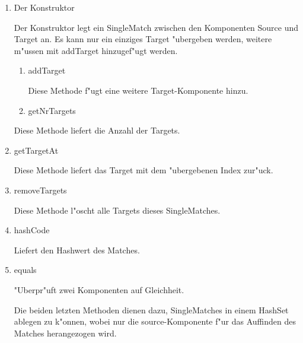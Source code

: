 \documentclass[a4paper,10pt,twoside]{scrreprt}
\begin{document}
\begin{enumerate}
\item Der Konstruktor

Der Konstruktor legt ein SingleMatch zwischen den Komponenten Source und Target an. Es kann nur ein einziges Target "ubergeben werden, weitere m"ussen mit addTarget hinzugef"ugt werden.
\begin{enumerate}


\item addTarget

Diese Methode f"ugt eine weitere Target-Komponente hinzu.

\item getNrTargets
\end{enumerate}
Diese Methode liefert die Anzahl der Targets.
\cite{AAR}\begin{center}

\end{center}
\item getTargetAt

Diese Methode liefert das Target mit dem "ubergebenen Index zur"uck.

\item removeTargets

Diese Methode l"oscht alle Targets dieses SingleMatches.

\item hashCode

Liefert den Hashwert des Matches.

\item equals

"Uberpr"uft zwei Komponenten auf Gleichheit.

Die beiden letzten Methoden dienen dazu, SingleMatches in einem HashSet ablegen zu k"onnen, wobei nur die source-Komponente f"ur das Auffinden des Matches herangezogen wird.

\end{enumerate}
\end{document}
